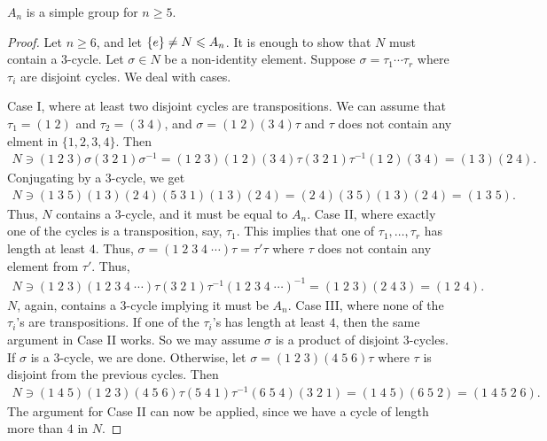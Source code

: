 \begin{theorem}
    $A_{n}$ is a simple group for $n \geq 5$.
\end{theorem}
\begin{proof}
    Let $n \geq 6$, and let $\{e\} \neq N \leqslant A_{n}$. It is enough to show that $N$ must contain a $3$-cycle. Let $\sigma \in N$ be a non-identity element. Suppose $\sigma = \tau_{1}\cdots\tau_{r}$ where $\tau_{i}$ are disjoint cycles. We deal with cases.

    Case I, where at least two disjoint cycles are transpositions. We can assume that $\tau_{1} = (1\;2)$ and $\tau_{2} = (3\;4)$, and $\sigma = (1\;2)(3\;4)\tau$ and $\tau$ does not contain any elment in $\{1,2,3,4\}$. Then
    \begin{align}
        N \ni (1\;2\;3) \sigma (3\;2\;1) \sigma^{-1} = (1\;2\;3)(1\;2)(3\;4)\tau(3\;2\;1)\tau^{-1}(1\;2)(3\;4) = (1\;3)(2\;4).
    \end{align}
    Conjugating by a $3$-cycle, we get
    \begin{align}
        N \ni (1\;3\;5)(1\;3)(2\;4)(5\;3\;1)(1\;3)(2\;4) = (2\;4)(3\;5)(1\;3)(2\;4) = (1\;3\;5).
    \end{align}
    Thus, $N$ contains a $3$-cycle, and it must be equal to $A_{n}$. Case II, where exactly one of the cycles is a transposition, say, $\tau_{1}$. This implies that one of $\tau_{1},\ldots,\tau_{r}$ has length at least $4$. Thus, $\sigma = (1\;2\;3\;4\;\cdots)\tau = \tau'\tau$ where $\tau$ does not contain any element from $\tau'$. Thus,
    \begin{align}
        N \ni (1\;2\;3)(1\;2\;3\;4\;\cdots)\tau(3\;2\;1)\tau^{-1}(1\;2\;3\;4\;\cdots)^{-1} = (1\;2\;3)(2\;4\;3) = (1\;2\;4).
    \end{align}
    $N$, again, contains a $3$-cycle implying it must be $A_{n}$. Case III, where none of the $\tau_{i}$'s are transpositions. If one of the $\tau_{i}$'s has length at least $4$, then the same argument in Case II works. So we may assume $\sigma$ is a product of disjoint $3$-cycles. If $\sigma$ is a $3$-cycle, we are done. Otherwise, let $\sigma = (1\;2\;3)(4\;5\;6)\tau$ where $\tau$ is disjoint from the previous cycles. Then
    \begin{align}
        N \ni (1\;4\;5)(1\;2\;3)(4\;5\;6)\tau(5\;4\;1)\tau^{-1}(6\;5\;4)(3\;2\;1) = (1\;4\;5)(6\;5\;2) = (1\;4\;5\;2\;6).
    \end{align}
    The argument for Case II can now be applied, since we have a cycle of length more than $4$ in $N$.
\end{proof}